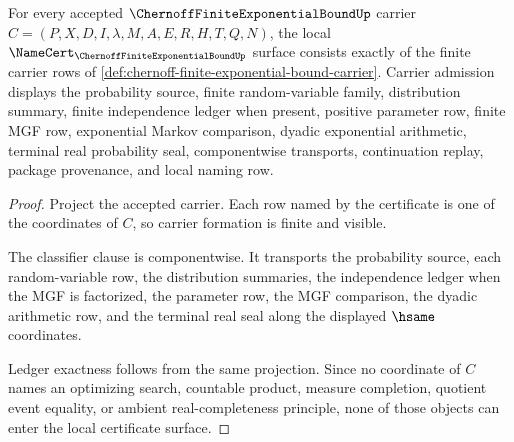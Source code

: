 \begin{theorem}
\label{thm:chernoff-finite-exponential-bound-namecert-obligations}
For every accepted $\ChernoffFiniteExponentialBoundUp$ carrier $C=(P,X,D,I,\lambda,M,A,E,R,H,T,Q,N)$, the local $\NameCert_{\ChernoffFiniteExponentialBoundUp}$ surface consists exactly of the finite carrier rows of \autoref{def:chernoff-finite-exponential-bound-carrier}. Carrier admission displays the probability source, finite random-variable family, distribution summary, finite independence ledger when present, positive parameter row, finite MGF row, exponential Markov comparison, dyadic exponential arithmetic, terminal real probability seal, componentwise transports, continuation replay, package provenance, and local naming row.
\end{theorem}
\begin{proof}
Project the accepted carrier. Each row named by the certificate is one of the coordinates of $C$, so carrier formation is finite and visible.

The classifier clause is componentwise. It transports the probability source, each random-variable row, the distribution summaries, the independence ledger when the MGF is factorized, the parameter row, the MGF comparison, the dyadic arithmetic row, and the terminal real seal along the displayed $\hsame$ coordinates.

Ledger exactness follows from the same projection. Since no coordinate of $C$ names an optimizing search, countable product, measure completion, quotient event equality, or ambient real-completeness principle, none of those objects can enter the local certificate surface.
\end{proof}

